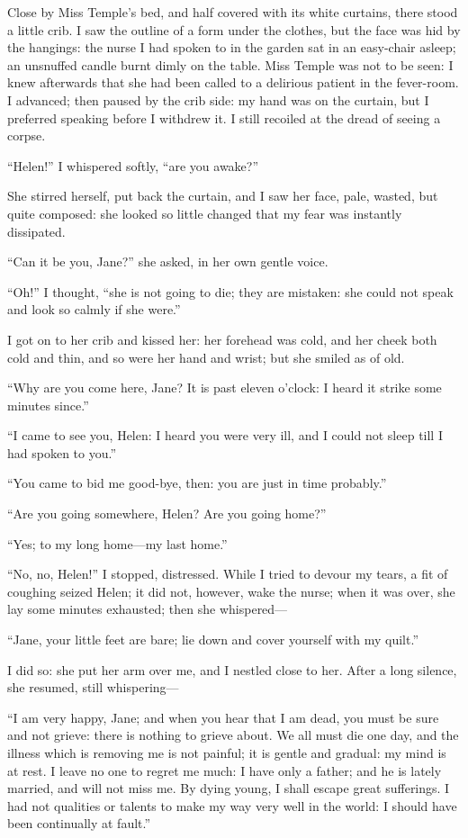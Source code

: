 Close by Miss Temple's bed, and half covered with its white curtains,
there stood a little crib. I saw the outline of a form under the
clothes, but the face was hid by the hangings: the nurse I had spoken to
in the garden sat in an easy-chair asleep; an unsnuffed candle burnt
dimly on the table. Miss Temple was not to be seen: I knew afterwards
that she had been called to a delirious patient in the fever-room. I
advanced; then paused by the crib side: my hand was on the curtain, but
I preferred speaking before I withdrew it. I still recoiled at the
dread of seeing a corpse.

\enquote{Helen!} I whispered softly, \enquote{are you awake?}

She stirred herself, put back the curtain, and I saw her face, pale,
wasted, but quite composed: she looked so little changed that my fear
was instantly dissipated.

\enquote{Can it be you, Jane?} she asked, in her own gentle voice.

\enquote{Oh!} I thought, \enquote{she is not going to die; they are
	mistaken: she could not speak and look so calmly if she were.}

I got on to her crib and kissed her: her forehead was cold, and her
cheek both cold and thin, and so were her hand and wrist; but she smiled
as of old.

\enquote{Why are you come here, Jane? It is past eleven o'clock: I
	heard it strike some minutes since.}

\enquote{I came to see you, Helen: I heard you were very ill, and I
	could not sleep till I had spoken to you.}

\enquote{You came to bid me good-bye, then: you are just in time
	probably.}

\enquote{Are you going somewhere, Helen? Are you going home?}

\enquote{Yes; to my long home---my last home.}

\enquote{No, no, Helen!} I stopped, distressed. While I tried to
devour my tears, a fit of coughing seized Helen; it did not, however,
wake the nurse; when it was over, she lay some minutes exhausted; then
she whispered---

\enquote{Jane, your little feet are bare; lie down and cover yourself
	with my quilt.}

I did so: she put her arm over me, and I nestled close to her. After a
long silence, she resumed, still whispering---

\enquote{I am very happy, Jane; and when you hear that I am dead, you
	must be sure and not grieve: there is nothing to grieve about. We all
	must die one day, and the illness which is removing me is not painful;
	it is gentle and gradual: my mind is at rest. I leave no one to regret
	me much: I have only a father; and he is lately married, and will not
	miss me. By dying young, I shall escape great sufferings. I had not
	qualities or talents to make my way very well in the world: I should
	have been continually at fault.}

